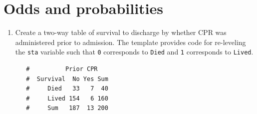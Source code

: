 \documentclass[letterpaper,12pt,twoside,]{pinp}
\begin{document}
\newpage

\hypertarget{odds-and-probabilities}{%
\section{Odds and probabilities}\label{odds-and-probabilities}}

\begin{enumerate}
\def\labelenumi{\arabic{enumi}.}
\item
  Create a two-way table of survival to discharge by whether CPR was
  administered prior to admission. The template provides code for
  re-leveling the \texttt{sta} variable such that \texttt{0} corresponds
  to \texttt{Died} and \texttt{1} corresponds to \texttt{Lived}.

\begin{Shaded}
\begin{Highlighting}[]
\NormalTok{(}\NormalTok{)}
\end{Highlighting}
\end{Shaded}

\begin{Shaded}
\begin{Highlighting}[]
\NormalTok{(}\NormalTok{)}

\OperatorTok{$}\StringTok{ }\OperatorTok{$} \NormalTok{(}\OperatorTok{$}

\NormalTok{(}\OperatorTok{$}\OperatorTok{$}
              \NormalTok{(}\NormalTok{, }\NormalTok{)))}
\end{Highlighting}
\end{Shaded}

  \begin{ShadedResult}
   \begin{verbatim}
   #          Prior CPR
   #  Survival  No Yes Sum
   #     Died   33   7  40
   #     Lived 154   6 160
   #     Sum   187  13 200
   \end{verbatim}
   \end{ShadedResult}


\end{enumerate}
\end{document}
